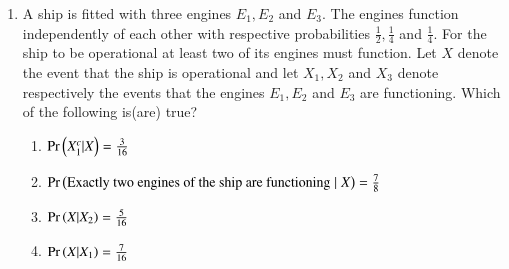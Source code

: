 \documentclass[journal,12pt,twocolumn,article]{IEEEtran}
\theoremstyle{remark}
\begin{document}
\begin{enumerate}[start = 3]
\begin{enumerate}
\end{enumerate}
\item A ship is fitted with three engines $E_1,E_2$ and $E_3$. The engines function independently of each other with respective probabilities $\frac{1}{2},\frac{1}{4}$ and $\frac{1}{4}$. For the ship to be operational at least two of its engines must function. Let $X$ denote the event that the ship is operational and let $X_1,X_2$ and $X_3$ denote respectively the events that the engines $E_1,E_2$ and $E_3$ are functioning. Which of the following is(are) true?
\hfill{}
\begin{enumerate}
\item $\Pr\left(X_1^c|X\right)=\frac{3}{16}$
\item $\Pr\left(\text{Exactly two engines of the ship are functioning}\;|\; X\right)=\frac{7}{8}$
\item $\Pr\left(X|X_2\right)=\frac{5}{16}$
\item $\Pr\left(X|X_1\right)=\frac{7}{16}$
\end{enumerate}
\end{enumerate}
\end{document}
